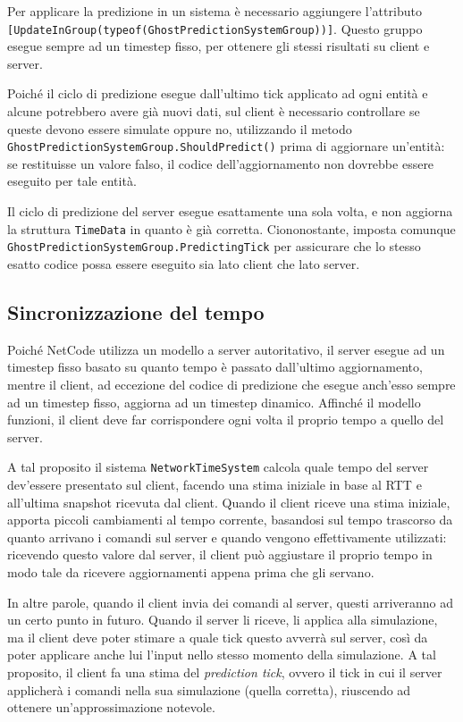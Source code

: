 Per applicare la predizione in un sistema è necessario aggiungere l'attributo \verb|[UpdateInGroup(typeof(GhostPredictionSystemGroup))]|. Questo gruppo esegue sempre ad un timestep fisso, per ottenere gli stessi risultati su client e server.

Poiché il ciclo di predizione esegue dall'ultimo tick applicato ad ogni entità e alcune potrebbero avere già nuovi dati, sul client è necessario controllare se queste devono essere simulate oppure no, utilizzando il metodo \verb|GhostPredictionSystemGroup.ShouldPredict()| prima di aggiornare un'entità: se restituisse un valore falso, il codice dell'aggiornamento non dovrebbe essere eseguito per tale entità.

Il ciclo di predizione del server esegue esattamente una sola volta, e non aggiorna la struttura \verb|TimeData| in quanto è già corretta. Ciononostante, imposta comunque \verb|GhostPredictionSystemGroup.PredictingTick| per assicurare che lo stesso esatto codice possa essere eseguito sia lato client che lato server.

\subsection{Sincronizzazione del tempo}
Poiché NetCode utilizza un modello a server autoritativo, il server esegue ad un timestep fisso basato su quanto tempo è passato dall'ultimo aggiornamento, mentre il client, ad eccezione del codice di predizione che esegue anch'esso sempre ad un timestep fisso, aggiorna ad un timestep dinamico. Affinché il modello funzioni, il client deve far corrispondere ogni volta il proprio tempo a quello del server.

A tal proposito il sistema \verb|NetworkTimeSystem| calcola quale tempo del server dev'essere presentato sul client, facendo una stima iniziale in base al RTT e all'ultima snapshot ricevuta dal client. Quando il client riceve una stima iniziale, apporta piccoli cambiamenti al tempo corrente, basandosi sul tempo trascorso da quanto arrivano i comandi sul server e quando vengono effettivamente utilizzati: ricevendo questo valore dal server, il client può aggiustare il proprio tempo in modo tale da ricevere aggiornamenti appena prima che gli servano.

In altre parole, quando il client invia dei comandi al server, questi arriveranno ad un certo punto in futuro. Quando il server li riceve, li applica alla simulazione, ma il client deve poter stimare a quale tick questo avverrà sul server, così da poter applicare anche lui l'input nello stesso momento della simulazione. A tal proposito, il client fa una stima del \emph{prediction tick}, ovvero il tick in cui il server applicherà i comandi nella sua simulazione (quella corretta), riuscendo ad ottenere un'approssimazione notevole.

